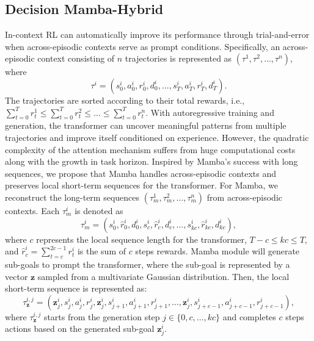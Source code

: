\subsection{Decision Mamba-Hybrid}

In-context RL can automatically improve its performance through trial-and-error when across-episodic contexts serve as prompt conditions. Specifically, an across-episodic context consisting of $n$ trajectories is represented as $(\tau^{1},\tau^{2},\dots,\tau^{n})$, where
\begin{equation}
    \tau^{i}= (s_0^i,a_0^i,r_0^i,d_0^i,\dots,s_T^i,a_T^i,r_T^i,d_T^i).
\label{coe}
\end{equation}
The trajectories are sorted according to their total rewards, i.e.,$\sum_{t=0}^T{r_t^1}\leq\sum_{t=0}^T{r_t^2}\leq\dots\leq\sum_{t=0}^T{r_t^n}$. With autoregressive training and generation, the transformer can uncover meaningful patterns from multiple trajectories and improve itself conditioned on experience. However, the quadratic complexity of the attention mechanism suffers from huge computational costs along with the growth in task horizon. Inspired by Mamba's success with long sequences, we propose that Mamba handles across-episodic contexts and preserves local short-term sequences for the transformer. For Mamba, we reconstruct the long-term sequences $(\tau_m^{1},\tau_m^{2},\dots,\tau_m^{n})$ from across-episodic contexts. Each $\tau_m^{i}$ is denoted as
\begin{equation}
\tau_m^{i}=(s_0^i,\hat{r}_0^i,d_0^i,s_{c}^i,\hat{r}_{c}^i,d_{c}^i,\dots,s_{kc}^i,\hat{r}_{kc}^i,d_{kc}^i),
\label{mamba}
\end{equation}
where $c$ represents the local sequence length for the transformer, $T-c\leq kc \leq T$, and $\hat{r}_c^i=\sum_{t=c}^{2c-1}{r_t^i}$ is the sum of $c$ steps rewards. Mamba module will generate sub-goals to prompt the transformer, where the sub-goal is represented by a vector $\textbf{z}$ sampled from a multivariate Gaussian distribution. Then, the local short-term sequence is represented as:
\begin{equation}
\tau_\textbf{z}^{i,j}=(\textbf{z}_j^i,s_j^i,a_j^i,r_j^i, \textbf{z}_{j}^i,s_{j+1}^i,a_{j+1}^i,r_{j+1}^i, \dots,\textbf{z}_{j}^i,s_{j+c-1}^i,a_{j+c-1}^i,r_{j+c-1}^i),
\label{transformer}
\end{equation}
where $\tau_\textbf{z}^{i,j}$ starts from the generation step $j\in\{0,c,\dots,kc\}$ and completes $c$ steps actions based on the generated sub-goal $\textbf{z}_j^i$.

